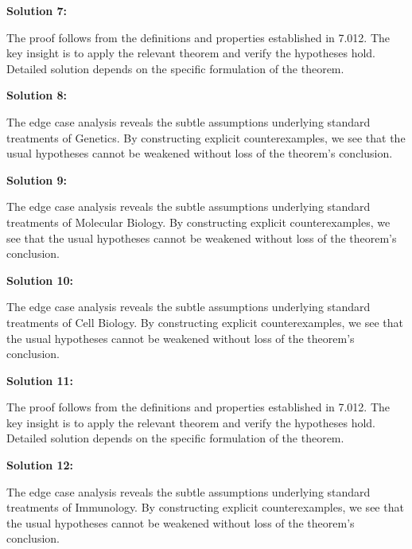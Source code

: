 \documentclass[12pt,a4paper]{exam}
\begin{document}
\vspace{0.5cm}

\textbf{Solution 7:}

The proof follows from the definitions and properties established in 7.012. The key insight is to apply the relevant theorem and verify the hypotheses hold. Detailed solution depends on the specific formulation of the theorem.

\vspace{0.5cm}

\textbf{Solution 8:}

The edge case analysis reveals the subtle assumptions underlying standard treatments of Genetics. By constructing explicit counterexamples, we see that the usual hypotheses cannot be weakened without loss of the theorem's conclusion.

\vspace{0.5cm}

\textbf{Solution 9:}

The edge case analysis reveals the subtle assumptions underlying standard treatments of Molecular Biology. By constructing explicit counterexamples, we see that the usual hypotheses cannot be weakened without loss of the theorem's conclusion.

\vspace{0.5cm}

\textbf{Solution 10:}

The edge case analysis reveals the subtle assumptions underlying standard treatments of Cell Biology. By constructing explicit counterexamples, we see that the usual hypotheses cannot be weakened without loss of the theorem's conclusion.

\vspace{0.5cm}

\textbf{Solution 11:}

The proof follows from the definitions and properties established in 7.012. The key insight is to apply the relevant theorem and verify the hypotheses hold. Detailed solution depends on the specific formulation of the theorem.

\vspace{0.5cm}

\textbf{Solution 12:}

The edge case analysis reveals the subtle assumptions underlying standard treatments of Immunology. By constructing explicit counterexamples, we see that the usual hypotheses cannot be weakened without loss of the theorem's conclusion.
\end{document}

